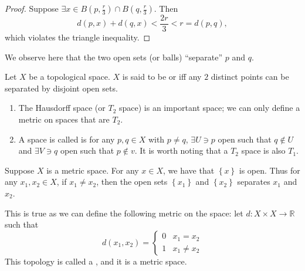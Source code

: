 \documentclass[notoc,notitlepage]{tufte-book}
\begin{document}
\begin{proof}
  Suppose $\exists x \in B \left( p, \frac{r}{3} \right) \cap B \left( q, \frac{r}{3} \right)$.
  Then
  \begin{equation*}
    d(p, x) + d(q, x) < \frac{2r}{3} < r = d(p, q),
  \end{equation*}
  which violates the triangle inequality.
\end{proof}

We observe here that the two open sets (or balls) ``separate'' $p$ and $q$.

\begin{defn}[Hausdorff / $T_2$]\label{defn:hausdorff_t_2_}
  Let $X$ be a topological space. $X$ is said to be  or 
  iff any $2$ distinct points can be separated by disjoint open sets.
\end{defn}

\begin{note}
  \begin{enumerate}
    \item The Hausdorff space (or $T_2$ space) is an important space;
      we can only define a metric on spaces that are $T_2$.
    \item A space is called  is for any $p, q \in X$ with $p \neq q$,
      $\exists U \ni p$ open such that $q \notin U$ and $\exists V \ni q$ open
      such that $p \notin v$. It is worth noting that a $T_2$ space is also
      $T_1$.
  \end{enumerate}
\end{note}

\begin{eg}
  Suppose $X$ is a metric space. For any $x \in X$, we have that $\left\{ x \right\}$ is open.
  Thus for any $x_1, x_2 \in X$, if $x_1 \neq x_2$, then the open sets
  $\left\{ x_1 \right\}$ and $\left\{ x_2 \right\}$ separates $x_1$ and $x_2$.

  This is true as we can define the following metric on the space:
  let $d : X \times X \to \mathbb{R}$ such that
  \begin{equation*}
    d(x_1, x_2) = \begin{cases}
      0 & x_1 = x_2 \\
      1 & x_1 \neq x_2
    \end{cases}
  \end{equation*}
  This topology is called a , and it is a metric space.
\end{eg}
\end{document}

